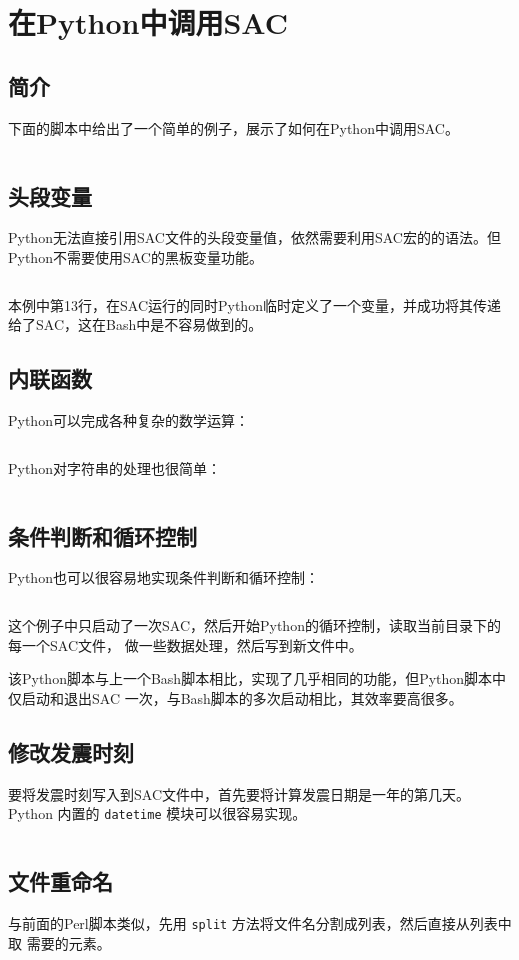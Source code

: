\section{在Python中调用SAC}
\label{sec:sac-python}

\subsection{简介}
下面的脚本中给出了一个简单的例子，展示了如何在Python中调用SAC。
\inputminted{python}{./call-in-script/simple-script.py}

\subsection{头段变量}
Python无法直接引用SAC文件的头段变量值，依然需要利用SAC宏的的语法。但Python不需要使用SAC的黑板变量功能。
\inputminted{python}{./call-in-script/variables.py}
本例中第13行，在SAC运行的同时Python临时定义了一个变量，并成功将其传递给了SAC，这在Bash中是不容易做到的。

\subsection{内联函数}
Python可以完成各种复杂的数学运算：
\inputminted{python}{./call-in-script/arithmetic-functions.py}

Python对字符串的处理也很简单：
\inputminted{python}{./call-in-script/string-functions.py}

\subsection{条件判断和循环控制}
Python也可以很容易地实现条件判断和循环控制：
\inputminted{python}{./call-in-script/do-loops.py}
这个例子中只启动了一次SAC，然后开始Python的循环控制，读取当前目录下的每一个SAC文件，
做一些数据处理，然后写到新文件中。

该Python脚本与上一个Bash脚本相比，实现了几乎相同的功能，但Python脚本中仅启动和退出SAC
一次，与Bash脚本的多次启动相比，其效率要高很多。

\subsection{修改发震时刻}
要将发震时刻写入到SAC文件中，首先要将计算发震日期是一年的第几天。Python
内置的 \texttt{datetime} 模块可以很容易实现。
\inputminted{python}{./call-in-script/ch-origin.py}

\subsection{文件重命名}
\label{subsec:rename-in-python}
与前面的Perl脚本类似，先用 \texttt{split} 方法将文件名分割成列表，然后直接从列表中取
需要的元素。
\inputminted{python}{./call-in-script/rename.py}
